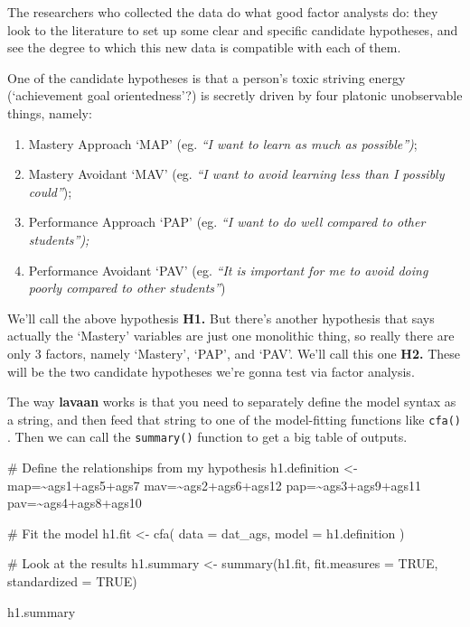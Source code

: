 \documentclass[
  letterpaper,
  DIV=11,
  numbers=noendperiod]{scrreprt}
\newenvironment{Shaded}{\begin{snugshade}}{\end{snugshade}}
\newcommand{\AttributeTok}[1]{\textcolor[rgb]{0.40,0.45,0.13}{#1}}
\newcommand{\CommentTok}[1]{\textcolor[rgb]{0.37,0.37,0.37}{#1}}
\newcommand{\ConstantTok}[1]{\textcolor[rgb]{0.56,0.35,0.01}{#1}}
\newcommand{\FunctionTok}[1]{\textcolor[rgb]{0.28,0.35,0.67}{#1}}
\newcommand{\NormalTok}[1]{\textcolor[rgb]{0.00,0.23,0.31}{#1}}
\newcommand{\OtherTok}[1]{\textcolor[rgb]{0.00,0.23,0.31}{#1}}
\newcommand{\StringTok}[1]{\textcolor[rgb]{0.13,0.47,0.30}{#1}}
\begin{document}
The researchers who collected the data do what good factor analysts do:
they look to the literature to set up some clear and specific candidate
hypotheses, and see the degree to which this new data is compatible with
each of them.

One of the candidate hypotheses is that a person's toxic striving energy
(`achievement goal orientedness'?) is secretly driven by four platonic
unobservable things, namely:

\begin{enumerate}
\def\labelenumi{\arabic{enumi}.}
\item
  Mastery Approach `MAP' (eg. \emph{``I want to learn as much as
  possible'')};
\item
  Mastery Avoidant `MAV' (eg. \emph{``I want to avoid learning less than
  I possibly could''});
\item
  Performance Approach `PAP' (eg. \emph{``I want to do well compared to
  other students'');}
\item
  Performance Avoidant `PAV' (eg. \emph{``It is important for me to
  avoid doing poorly compared to other students''})
\end{enumerate}

We'll call the above hypothesis \textbf{H1.} But there's another
hypothesis that says actually the `Mastery' variables are just one
monolithic thing, so really there are only 3 factors, namely `Mastery',
`PAP', and `PAV'. We'll call this one \textbf{H2.} These will be the two
candidate hypotheses we're gonna test via factor analysis.

The way \textbf{lavaan} works is that you need to separately define the
model syntax as a string, and then feed that string to one of the
model-fitting functions like \texttt{cfa()} . Then we can call the
\texttt{summary()} function to get a big table of outputs.

\begin{Shaded}
\begin{Highlighting}[]
\CommentTok{\# Define the relationships from my hypothesis}
\NormalTok{h1.definition }\OtherTok{\textless{}{-}} 
\StringTok{\textquotesingle{}map=\textasciitilde{}ags1+ags5+ags7}
\StringTok{mav=\textasciitilde{}ags2+ags6+ags12}
\StringTok{pap=\textasciitilde{}ags3+ags9+ags11}
\StringTok{pav=\textasciitilde{}ags4+ags8+ags10\textquotesingle{}}

\CommentTok{\# Fit the model}
\NormalTok{h1.fit }\OtherTok{\textless{}{-}} \FunctionTok{cfa}\NormalTok{(}
  \AttributeTok{data  =}\NormalTok{ dat\_ags,}
  \AttributeTok{model =}\NormalTok{ h1.definition}
\NormalTok{)}

\CommentTok{\# Look at the results}
\NormalTok{h1.summary }\OtherTok{\textless{}{-}} \FunctionTok{summary}\NormalTok{(h1.fit, }\AttributeTok{fit.measures =} \ConstantTok{TRUE}\NormalTok{, }\AttributeTok{standardized =} \ConstantTok{TRUE}\NormalTok{)}

\NormalTok{h1.summary}
\end{Highlighting}
\end{Shaded}
\end{document}
